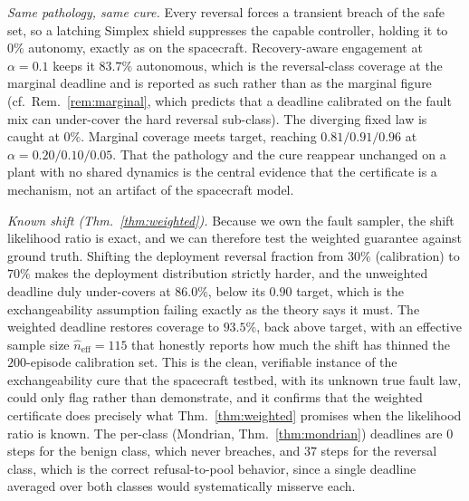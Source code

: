 \documentclass[journal]{IEEEtran}
\theoremstyle{plain}
\theoremstyle{definition}
\begin{document}
\emph{Same pathology, same cure.} Every reversal forces a transient breach of the safe set,
so a latching Simplex shield suppresses the capable controller, holding it to $0\%$ autonomy,
exactly as on the spacecraft. Recovery-aware engagement at $\alpha=0.1$ keeps it $83.7\%$
autonomous, which is the reversal-class coverage at the marginal deadline and is reported as
such rather than as the marginal figure (cf.\ Rem.~\ref{rem:marginal}, which predicts that a
deadline calibrated on the fault mix can under-cover the hard reversal sub-class). The
diverging fixed law is caught at $0\%$. Marginal coverage meets target, reaching
$0.81/0.91/0.96$ at $\alpha=0.20/0.10/0.05$. That the pathology and the cure reappear
unchanged on a plant with no shared dynamics is the central evidence that the certificate is
a mechanism, not an artifact of the spacecraft model.

\emph{Known shift (Thm.~\ref{thm:weighted}).} Because we own the fault sampler, the shift
likelihood ratio is exact, and we can therefore test the weighted guarantee against ground
truth. Shifting the deployment reversal fraction from $30\%$
(calibration) to $70\%$ makes the deployment distribution strictly harder, and the unweighted
deadline duly under-covers at $86.0\%$, below its $0.90$ target, which is the exchangeability
assumption failing exactly as the theory says it must. The weighted deadline restores coverage
to $93.5\%$, back above target, with an effective sample size
$\widehat{n}_{\mathrm{eff}}=115$ that honestly reports how much the shift has thinned the
$200$-episode calibration set. This is the clean, verifiable instance of the exchangeability
cure that the spacecraft testbed, with its unknown true fault law, could only flag rather than
demonstrate, and it confirms that the weighted certificate does precisely what
Thm.~\ref{thm:weighted} promises when the likelihood ratio is known. The per-class (Mondrian,
Thm.~\ref{thm:mondrian}) deadlines are $0$ steps for the benign class, which never breaches,
and $37$ steps for the reversal class, which is the correct refusal-to-pool behavior, since a
single deadline averaged over both classes would systematically misserve each.
\end{document}
